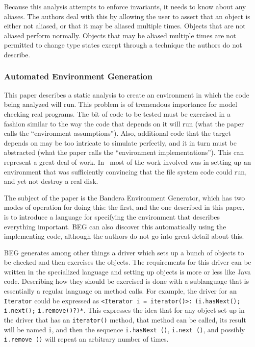 \documentclass{article}
\begin{document}
\begin{multicols}{2}
Because this analysis attempts to enforce invariants, it needs to know
about any aliases.  The authors deal with this by allowing the user to
assert that an object is either not aliased, or that it may be aliased
multiple times.  Objects that are not aliased perform normally.
Objects that may be aliased multiple times are not permitted to change
type states except through a technique the authors do not describe.

\subsubsection{Automated Environment Generation~\cite{tkachuk03automated}}

This paper describes a static analysis to create an environment in
which the code being analyzed will run.  This problem is of tremendous
importance for model checking real programs.  The bit of code to be
tested must be exercised in a fashion similar to the way the code that
depends on it will run (what the paper calls the ``environment
assumptions'').  Also, additional code that the target depends on may
be too intricate to simulate perfectly, and it in turn must be
abstracted (what the paper calls the ``environment implementations'').
This can represent a great deal of work.  In~\cite{yang04using} most
of the work involved was in setting up an environment that was
sufficiently convincing that the file system code could run, and yet
not destroy a real disk.

The subject of the paper is the Bandera Environment Generator, which
has two modes of operation for doing this: the first, and the one
described in this paper, is to introduce a language for specifying the
environment that describes everything important.  BEG can also
discover this automatically using the implementing code, although the
authors do not go into great detail about this.

BEG generates among other things a driver which sets up a bunch of
objects to be checked and then exercises the objects.  The
requirements for this driver can be written in the specialized
language and setting up objects is more or less like Java code.
Describing how they should be exercised is done with a sublanguage
that is essentially a regular language on method calls.  For example,
the driver for an \texttt{Iterator} could be expressed as
\texttt{<Iterator i = iterator()>:} \texttt{(i.hasNext();}
\texttt{i.next();} \texttt{i.remove()?)*}.  This expresses the idea
that for any object set up in the driver that has an
\texttt{iterator()} method, that method can be called, its result will
be named \texttt{i}, and then the sequence \texttt{i.hasNext ()},
\texttt{i.next ()}, and possibly \texttt{i.remove ()} will repeat an
arbitrary number of times.


\end{multicols}
\end{document}

